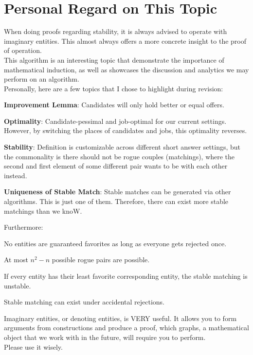 \section{Personal Regard on This Topic}
When doing proofs regarding stability, it is always advised to operate with imaginary entities. This almost always offers a more concrete insight to the proof of operation. \\
This algorithm is an interesting topic that demonstrate the importance of mathematical induction, as well as showcases the discussion and analytics we may perform on an algorithm. \\
Personally, here are a few topics that I chose to highlight during revision:
\begin{bindenum}
    \item \textbf{Improvement Lemma}: Candidates will only hold better or equal offers.
    \item \textbf{Optimality}: Candidate-pessimal and job-optimal for our current settings. However, by switching the places of candidates and jobs, this optimality reverses.
    \item \textbf{Stability}: Definition is customizable across different short answer settings, but the commonality is there should not be rogue couples (matchings), where the second and first element of some different pair wants to be with each other instead.
    \item \textbf{Uniqueness of Stable Match}: Stable matches can be generated via other algorithms. This is just one of them. Therefore, there can exist more stable matchings than we knoW.
\end{bindenum}
Furthermore:
\begin{bindenum}
    \item No entities are guaranteed favorites as long as everyone gets rejected once.
    \item At most $n^2 - n$ possible rogue pairs are possible.
    \item If every entity has their least favorite corresponding entity, the stable matching is unstable.
    \item Stable matching can exist under accidental rejections.
\end{bindenum}
Imaginary entities, or denoting entities, is VERY useful. It allows you to form arguments from constructions and produce a proof, which graphs, a mathematical object that we work with in the future, will require you to perform. \\
Please use it wisely.
